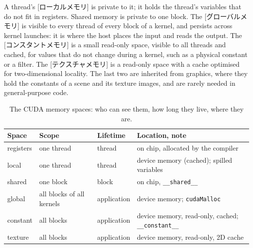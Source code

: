 \documentclass[../main.tex]{subfiles}
\begin{document}
\begin{definition}
  A thread's [ローカルメモリ] is private to it; it
  holds the thread's variables that do not fit in registers.  Shared
  memory is private to one block.  The [グローバルメモリ]
  is visible to every thread of every block of a kernel, and persists
  across kernel launches: it is where the host places the input and reads
  the output.  The [コンスタントメモリ] is a small
  read-only space, visible to all threads and cached, for values that do
  not change during a kernel, such as a physical constant or a filter.
  The [テクスチャメモリ] is a read-only space with a
  cache optimised for two-dimensional locality.  The last two are
  inherited from graphics, where they hold the constants of a scene and
  its texture images, and are rarely needed in general-purpose
  code.
\end{definition}

\begin{table}[tb]
  \centering
  \small
  \caption{The CUDA memory spaces: who can see them, how long they live,
    where they are.}
  \label{tab:l03-memory-spaces}
  \begin{tabular}{>{\raggedright\arraybackslash}p{18mm}
                  >{\raggedright\arraybackslash}p{24mm}
                  >{\raggedright\arraybackslash}p{16mm}
                  >{\raggedright\arraybackslash}p{42mm}}
    \toprule
    Space & Scope & Lifetime & Location, note \\
    \midrule
    registers & one thread & thread & on chip, allocated by the compiler \\
    local & one thread & thread & device memory (cached); spilled variables \\
    shared & one block & block & on chip, \texttt{\_\_shared\_\_} \\
    \addlinespace
    global & all blocks of all kernels & application & device memory; \texttt{cudaMalloc} \\
    constant & all blocks & application & device memory, read-only, cached; \texttt{\_\_constant\_\_} \\
    texture & all blocks & application & device memory, read-only, 2D cache \\
    \bottomrule
  \end{tabular}
\end{table}
\end{document}
